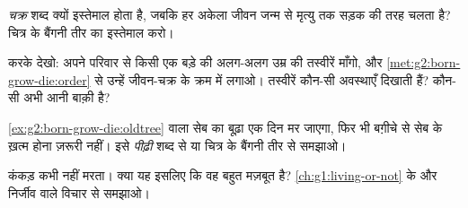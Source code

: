 \begin{exercise}[$\star$]\label{exo:g2:born-grow-die:7}
\emph{चक्र} शब्द क्यों इस्तेमाल होता है, जबकि हर अकेला जीवन जन्म से
मृत्यु तक सड़क की तरह चलता है? चित्र के बैंगनी तीर का इस्तेमाल करो।
\end{exercise}

\begin{exercise}[$\star$]\label{exo:g2:born-grow-die:8}
करके देखो: अपने परिवार से किसी एक बड़े की अलग-अलग उम्र की तस्वीरें
माँगो, और \cref{met:g2:born-grow-die:order} से उन्हें जीवन-चक्र के
क्रम में लगाओ। तस्वीरें कौन-सी अवस्थाएँ दिखाती हैं? कौन-सी 
अभी आनी बाक़ी है?
\end{exercise}

\begin{exercise}[$\star\star$]\label{exo:g2:born-grow-die:9}
\cref{ex:g2:born-grow-die:oldtree} वाला सेब का बूढ़ा  एक दिन मर
जाएगा, फिर भी बग़ीचे से सेब के  ख़त्म होना ज़रूरी नहीं। इसे
\emph{पीढ़ी} शब्द से या चित्र के बैंगनी तीर से समझाओ।
\end{exercise}

\begin{exercise}[$\star\star$]\label{exo:g2:born-grow-die:10}
कंकड़ कभी नहीं मरता। क्या यह इसलिए कि वह बहुत मज़बूत है?
\cref{ch:g1:living-or-not} के  और निर्जीव वाले विचार से समझाओ।
\end{exercise}

